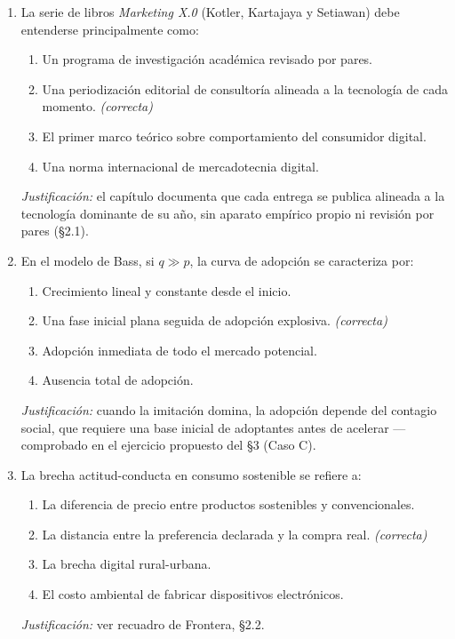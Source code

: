 \begin{enumerate}
  \item La serie de libros \textit{Marketing X.0} (Kotler, Kartajaya y
  Setiawan) debe entenderse principalmente como:
  \begin{enumerate}
    \item[a)] Un programa de investigación académica revisado por pares.
    \item[b)] Una periodización editorial de consultoría alineada a la tecnología de cada momento. \textit{(correcta)}
    \item[c)] El primer marco teórico sobre comportamiento del consumidor digital.
    \item[d)] Una norma internacional de mercadotecnia digital.
  \end{enumerate}
  \textit{Justificación:} el capítulo documenta que cada entrega se publica
  alineada a la tecnología dominante de su año, sin aparato empírico propio
  ni revisión por pares (\S 2.1).

  \item En el modelo de Bass, si $q \gg p$, la curva de adopción se
  caracteriza por:
  \begin{enumerate}
    \item[a)] Crecimiento lineal y constante desde el inicio.
    \item[b)] Una fase inicial plana seguida de adopción explosiva. \textit{(correcta)}
    \item[c)] Adopción inmediata de todo el mercado potencial.
    \item[d)] Ausencia total de adopción.
  \end{enumerate}
  \textit{Justificación:} cuando la imitación domina, la adopción depende del
  contagio social, que requiere una base inicial de adoptantes antes de
  acelerar — comprobado en el ejercicio propuesto del \S 3 (Caso C).

  \item La brecha actitud-conducta en consumo sostenible se refiere a:
  \begin{enumerate}
    \item[a)] La diferencia de precio entre productos sostenibles y convencionales.
    \item[b)] La distancia entre la preferencia declarada y la compra real. \textit{(correcta)}
    \item[c)] La brecha digital rural-urbana.
    \item[d)] El costo ambiental de fabricar dispositivos electrónicos.
  \end{enumerate}
  \textit{Justificación:} ver recuadro de Frontera, \S 2.2.
\end{enumerate}

